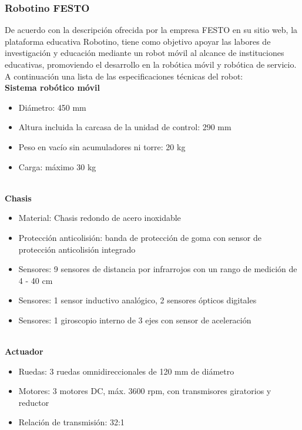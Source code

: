             \subsubsection{Robotino FESTO}
            De acuerdo con la descripción ofrecida por la empresa FESTO en su sitio web, la plataforma educativa Robotino, tiene como objetivo apoyar las labores de investigación y educación mediante un robot móvil al alcance de instituciones educativas, promoviendo el desarrollo en la robótica móvil y robótica de servicio. A continuación una lista de las especificaciones técnicas del robot:
            \phantom{saltodelineaforzado >:D}\\
            
            \textbf{Sistema robótico móvil}
            \begin{itemize}
                \item Diámetro: 450 mm
                \item Altura incluida la carcasa de la unidad de control: 290 mm
                \item Peso en vacío sin acumuladores ni torre: 20 kg
                \item Carga: máximo 30 kg
            \end{itemize}
            
            \phantom{saltodelineaforzado >:D}\\
            
            \textbf{Chasis}
            \begin{itemize}
                \item Material: Chasis redondo de acero inoxidable
                \item Protección anticolisión: banda de protección de goma con sensor de protección anticolisión integrado
                \item Sensores: 9 sensores de distancia por infrarrojos con un rango de medición de 4 - 40 cm
                \item Sensores: 1 sensor inductivo analógico, 2 sensores ópticos digitales
                \item Sensores: 1 giroscopio interno de 3 ejes con sensor de aceleración
            \end{itemize}

            \phantom{saltodelineaforzado >:D}\\
            
            \textbf{Actuador}
            \begin{itemize}
                \item Ruedas: 3 ruedas omnidireccionales de 120 mm de diámetro
                \item Motores: 3 motores DC, máx. 3600 rpm, con transmisores giratorios y reductor
                \item Relación de transmisión: 32:1
            \end{itemize}

